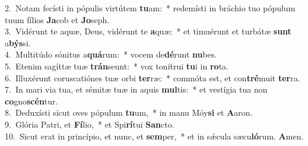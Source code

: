 {2.~}Notam fecísti in pópulis virtútem \textbf{tu}am:~* redemísti in bráchio tuo pópulum tuum fílios \textbf{Ja}cob et \textbf{Jo}seph.\\
{3.~}Vidérunt te aquæ, Deus, vidérunt te \textbf{a}quæ:~* et timuérunt et turbátæ \textbf{sunt} a\textbf{býs}si.\\
{4.~}Multitúdo sónitus a\textbf{quá}rum:~* vocem de\textbf{dé}runt \textbf{nu}bes.\\
{5.~}Etenim sagíttæ tuæ \textbf{trán}seunt:~* vox tonítrui \textbf{tu}i in \textbf{ro}ta.\\
{6.~}Illuxérunt coruscatiónes tuæ orbi \textbf{ter}ræ:~* commóta est, et con\textbf{tré}muit \textbf{ter}ra.\\
{7.~}In mari via tua, et sémitæ tuæ in aquis \textbf{mul}tis:~* et vestígia tua non \textbf{co}gno\textbf{scén}tur.\\
{8.~}Deduxísti sicut oves pópulum \textbf{tu}um,~* in manu Móy\textbf{si} et \textbf{A}aron.\\
{9.~}Glória Patri, et \textbf{Fí}lio,~* et Spi\textbf{rí}tui \textbf{San}cto.\\
{10.~}Sicut erat in princípio, et nunc, et \textbf{sem}per,~* et in sǽcula sæcu\textbf{ló}rum. \textbf{A}men.\\
